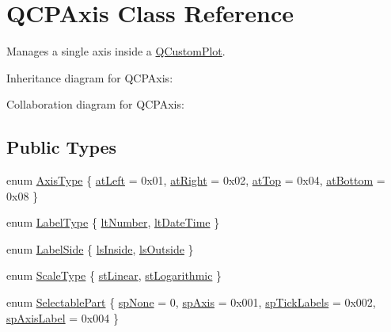 \hypertarget{classQCPAxis}{}\section{Q\+C\+P\+Axis Class Reference}
\label{classQCPAxis}


Manages a single axis inside a \hyperlink{classQCustomPlot}{Q\+Custom\+Plot}.  




Inheritance diagram for Q\+C\+P\+Axis\+:


Collaboration diagram for Q\+C\+P\+Axis\+:
\subsection*{Public Types}
\begin{DoxyCompactItemize}
\item 
enum \hyperlink{classQCPAxis_ae2bcc1728b382f10f064612b368bc18a}{Axis\+Type} \{ \hyperlink{classQCPAxis_ae2bcc1728b382f10f064612b368bc18aaf84aa6cac6fb6099f54a2cbf7546b730}{at\+Left} = 0x01, 
\hyperlink{classQCPAxis_ae2bcc1728b382f10f064612b368bc18aadf5509f7d29199ef2f263b1dd224b345}{at\+Right} = 0x02, 
\hyperlink{classQCPAxis_ae2bcc1728b382f10f064612b368bc18aac0ece2b680d3f545e701f75af1655977}{at\+Top} = 0x04, 
\hyperlink{classQCPAxis_ae2bcc1728b382f10f064612b368bc18aa220d68888516b6c3b493d144f1ba438f}{at\+Bottom} = 0x08
 \}
\item 
enum \hyperlink{classQCPAxis_a4a7da0166f755f5abac23b765d184cad}{Label\+Type} \{ \hyperlink{classQCPAxis_a4a7da0166f755f5abac23b765d184cada7f1eacf3b73adaefd334bea04e094b7e}{lt\+Number}, 
\hyperlink{classQCPAxis_a4a7da0166f755f5abac23b765d184cadafc70594a9d877124dd11ccc187d4ac52}{lt\+Date\+Time}
 \}
\item 
enum \hyperlink{classQCPAxis_a24b13374b9b8f75f47eed2ea78c37db9}{Label\+Side} \{ \hyperlink{classQCPAxis_a24b13374b9b8f75f47eed2ea78c37db9aae7b027ac2839cf4ad611df30236fc3f}{ls\+Inside}, 
\hyperlink{classQCPAxis_a24b13374b9b8f75f47eed2ea78c37db9a2eadb509fc0c9a8b35b85c86ec9f3c7a}{ls\+Outside}
 \}
\item 
enum \hyperlink{classQCPAxis_a36d8e8658dbaa179bf2aeb973db2d6f0}{Scale\+Type} \{ \hyperlink{classQCPAxis_a36d8e8658dbaa179bf2aeb973db2d6f0aff6e30a11a828bc850caffab0ff994f6}{st\+Linear}, 
\hyperlink{classQCPAxis_a36d8e8658dbaa179bf2aeb973db2d6f0abf5b785ad976618816dc6f79b73216d4}{st\+Logarithmic}
 \}
\item 
enum \hyperlink{classQCPAxis_abee4c7a54c468b1385dfce2c898b115f}{Selectable\+Part} \{ \hyperlink{classQCPAxis_abee4c7a54c468b1385dfce2c898b115fae0df8123a5528d5ccf87cb7794f971ea}{sp\+None} = 0, 
\hyperlink{classQCPAxis_abee4c7a54c468b1385dfce2c898b115fa8949d2c1a31eccae9be7ed32e7a1ae38}{sp\+Axis} = 0x001, 
\hyperlink{classQCPAxis_abee4c7a54c468b1385dfce2c898b115fa584e0a3dc4d064880647619f4bd4e771}{sp\+Tick\+Labels} = 0x002, 
\hyperlink{classQCPAxis_abee4c7a54c468b1385dfce2c898b115fa851e0600e0d08b4f5fee9361e3fedabd}{sp\+Axis\+Label} = 0x004
 \}
\end{DoxyCompactItemize}
